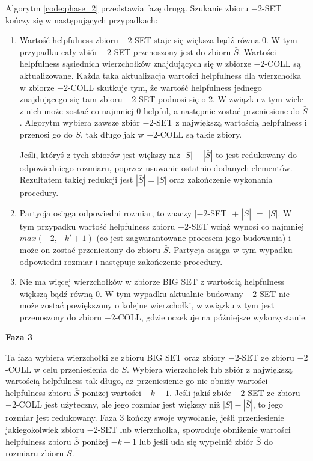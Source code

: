 Algorytm \ref{code:phase_2} przedstawia fazę drugą.
Szukanie zbioru $-2$-SET kończy się w następujących przypadkach:
\begin{enumerate}
    \item {Wartość helpfulness zbioru $-2$-SET staje się większa bądź równa 0. W tym przypadku cały zbiór $-2$-SET
    przenoszony jest do zbioru $\bar{S}$. Wartości helpfulness sąsiednich wierzchołków znajdujących się w zbiorze
    $-2$-COLL są aktualizowane. Każda taka aktualizacja wartości helpfulness dla wierzchołka w zbiorze $-2$-COLL
    skutkuje tym, że wartość helpfulness jednego znajdującego się tam zbioru $-2$-SET podnosi się o 2. W związku z tym
    wiele z nich może zostać co najmniej $0$-helpful, a następnie zostać przeniesione do $\bar{S}$.
    Algorytm wybiera zawsze zbiór $-2$-SET z największą wartością helpfulness i przenosi go do $\bar{S}$, tak długo
    jak w $-2$-COLL są takie zbiory.

    Jeśli, któryś z tych zbiorów jest większy niż $|S| - |\bar{S}|$ to jest redukowany do odpowiedniego rozmiaru, poprzez
    usuwanie ostatnio dodanych elementów. Rezultatem takiej redukcji jest $|\bar{S}| = |S|$ oraz zakończenie
    wykonania procedury.}
    \item {Partycja osiąga odpowiedni rozmiar, to znaczy $|-2$-SET$|$ $+$ $|\bar{S}|$ $=$ $|S|$. W tym przypadku wartość
    helpfulness zbioru $-2$-SET wciąż wynosi co najmniej $max(-2, -k' + 1)$ (co jest zagwarantowane procesem jego budowania)
    i może on zostać przeniesiony do zbioru $\bar{S}$. Partycja osiąga w tym wypadku odpowiedni rozmiar i następuje
    zakończenie procedury.}
    \item {Nie ma więcej wierzchołków w zbiorze BIG SET z wartością helpfulness większą bądź równą $0$. W tym wypadku
    aktualnie budowany $-2$-SET nie może zostać powiększony o kolejne wierzchołki, w związku z tym jest przenoszony do
    zbioru $-2$-COLL, gdzie oczekuje na późniejsze wykorzystanie.}
\end{enumerate}

\vspace{8mm}
\textbf{Faza 3}

Ta faza wybiera wierzchołki ze zbioru BIG SET oraz zbiory $-2$-SET ze zbioru $-2$-COLL w celu przeniesienia do
$\bar{S}$.
Wybiera wierzchołek lub zbiór z największą wartością helpfulness tak długo, aż przeniesienie go nie obniży wartości
helpfulness zbioru $\bar{S}$ poniżej wartości $-k+1$.
Jeśli jakiś zbiór $-2$-SET ze zbioru $-2$-COLL jest użyteczny, ale jego rozmiar jest większy niż $|S| - |\bar{S}|$,
to jego rozmiar jest redukowany.
Faza $3$ kończy swoje wywołanie, jeśli przeniesienie jakiegokolwiek zbioru $-2$-SET lub wierzchołka, spowoduje
obniżenie wartości helpfulness zbioru $\bar{S}$ poniżej $-k+1$ lub jeśli uda się wypełnić zbiór $\bar{S}$ do
rozmiaru zbioru $S$.
